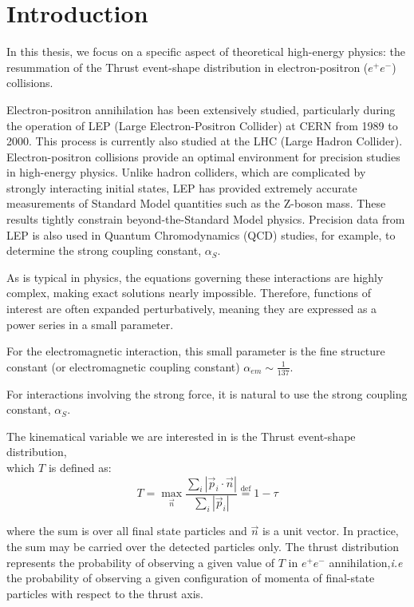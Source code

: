 \documentclass[../main.tex]{subfiles}
\begin{document}
\section{Introduction}

In this thesis, we focus on a specific aspect of theoretical high-energy physics: the resummation of the Thrust event-shape distribution in electron-positron ($e^+e^-$) collisions.

Electron-positron annihilation has been extensively studied, particularly during the operation of LEP (Large Electron-Positron Collider) at CERN from 1989 to 2000. 
This process is currently also studied at the LHC (Large Hadron Collider). Electron-positron collisions provide an optimal environment for precision studies in high-energy physics. 
Unlike hadron colliders, which are complicated by strongly interacting initial states, LEP has provided extremely accurate measurements of Standard Model quantities such as the Z-boson mass. 
These results tightly constrain beyond-the-Standard Model physics. Precision data from LEP is also used in Quantum Chromodynamics (QCD) studies, for example, to determine the strong coupling constant, $\alpha_S$.

As is typical in physics, the equations governing these interactions are highly complex, making exact solutions nearly impossible. Therefore, functions of interest are often expanded perturbatively, meaning they are expressed as a power series in a small parameter.

For the electromagnetic interaction, this small parameter is the fine structure constant (or electromagnetic coupling constant) $\alpha_{em} \sim \frac{1}{137}$.

For interactions involving the strong force, it is natural to use the strong coupling constant, $\alpha_S$.

The kinematical variable we are interested in is the Thrust event-shape distribution, \\
which $T$ is defined as:
\begin{equation} \label{eq:Thrust}
    T = \max_{\vec{n}} \frac{\sum_i |\vec{p}_i \cdot \vec{n}|}{\sum_i |\vec{p}_i|} \stackrel{\text{def}}{=} 1-\tau
\end{equation}

where the sum is over all final state particles and $\vec{n}$ is a unit vector.
In practice, the sum may be carried over the detected particles only. 
The thrust distribution represents the probability of observing a given value of $T$ in $e^+e^-$ annihilation,\emph{i.e} the probability of observing a given configuration of momenta of final-state particles 
with respect to the thrust axis.  
\end{document}
